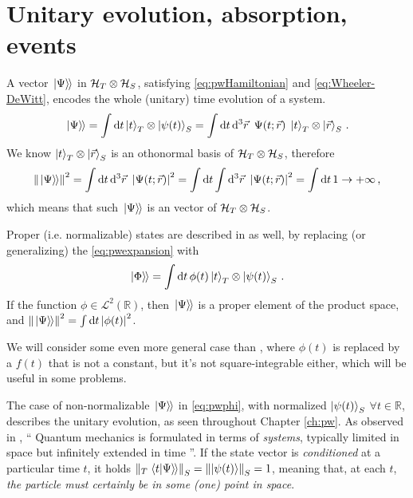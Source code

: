 \section{Unitary evolution, absorption, events}

A vector $\left.\left| \Psi \right\rangle\hspace{-0.115em}\right\rangle$ in $\mathcal{H}_T \otimes \mathcal{H}_S$,
satisfying \eqref{eq:pwHamiltonian} and \eqref{eq:Wheeler-DeWitt},
encodes the whole (unitary) time evolution of a system.
\begin{equation}\label{eq:pwexpansion}
  \left.\left| \Psi \right\rangle\hspace{-0.115em}\right\rangle =
    \int \dd{t} \ket{t}_T \otimes \ket{\psi(t)}_S =
    \int \dd{t}\dd[3]{\vec{r}} \ \Psi(t; \vec{r}) \; \ket{t}_T \otimes \ket{\vec{r}}_S
    \,  \text{.}
\end{equation}
We know $\ket{t}_T \otimes \ket{\vec{r}}_S$ is an othonormal basis of $\mathcal{H}_T \otimes \mathcal{H}_S$, therefore
\begin{equation}
  \norm{\left.\left| \Psi \right\rangle\hspace{-0.115em}\right\rangle}^2 =
    \int \dd{t}\dd[3]{\vec{r}} \ \abs{\Psi(t; \vec{r})}^2 =
    \int \dd{t} \int \dd[3]{\vec{r}} \ \abs{\Psi(t; \vec{r})}^2 =
    \int \dd{t} 1 \rightarrow +\infty
    \,  \text{,}
\end{equation}
which means that such $\left.\left| \Psi \right\rangle\hspace{-0.115em}\right\rangle$ is an  vector of $\mathcal{H}_T \otimes \mathcal{H}_S$.

Proper (i.e. normalizable) states are described in \cite{Lloyd:Time} as well, by replacing (or generalizing)
the \eqref{eq:pwexpansion} with
\begin{equation}\label{eq:pwphi}
  \left.\left| \Phi \right\rangle\hspace{-0.115em}\right\rangle =
    \int \dd{t} \phi(t) \ket{t}_T \otimes \ket{\psi(t)}_S \, \text{.}
\end{equation}
If the function $\phi \in \mathcal{L}^2(\mathbb{R})$,
then $\left.\left| \Psi \right\rangle\hspace{-0.115em}\right\rangle$ is a proper element of the product space,
and $\norm{\left.\left| \Psi \right\rangle\hspace{-0.115em}\right\rangle}^2 = \int \dd{t} \abs{\phi(t)}^2$.

We will consider some even more general case than \cite{Lloyd:Time},
where $\phi(t)$ is replaced by a $f(t)$ that is not a constant,
but it's not square-integrable either,
which will be useful in some problems.

The case of non-normalizable $\left.\left| \Psi \right\rangle\hspace{-0.115em}\right\rangle$ in \eqref{eq:pwphi},
with normalized $\ket{\psi(t)}_S$ $\forall t \in \mathbb{R}$,
describes the unitary evolution, as seen throughout Chapter \ref{ch:pw}.
As observed in \cite{Maccone:QGR},
``%
  Quantum mechanics is formulated in terms of \emph{systems},
  typically limited in space but infinitely extended in time%
''.
If the state vector is \emph{conditioned} at a particular time $t$,
it holds $\norm{_{T}\left.\left\langle t \middle| \Psi \right\rangle\hspace{-0.115em}\right\rangle}_S = \norm{\ket{\psi(t)}}_S = 1$,
meaning that, at each $t$,
\emph{the particle must certainly be in some (one) point in space}.

